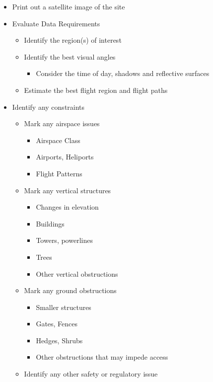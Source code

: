 \documentclass[
]{book}
\providecommand{\tightlist}{%
  \setlength{\itemsep}{0pt}\setlength{\parskip}{0pt}}
\begin{document}
\begin{itemize}
\tightlist
\item
  Print out a satellite image of the site
\item
  Evaluate Data Requirements

  \begin{itemize}
  \tightlist
  \item
    Identify the region(s) of interest
  \item
    Identify the best visual angles

    \begin{itemize}
    \tightlist
    \item
      Consider the time of day, shadows and reflective surfaces
    \end{itemize}
  \item
    Estimate the best flight region and flight paths
  \end{itemize}
\item
  Identify any constraints

  \begin{itemize}
  \tightlist
  \item
    Mark any airspace issues

    \begin{itemize}
    \tightlist
    \item
      Airspace Class
    \item
      Airports, Heliports
    \item
      Flight Patterns
    \end{itemize}
  \item
    Mark any vertical structures

    \begin{itemize}
    \tightlist
    \item
      Changes in elevation
    \item
      Buildings
    \item
      Towers, powerlines
    \item
      Trees
    \item
      Other vertical obstructions
    \end{itemize}
  \item
    Mark any ground obstructions

    \begin{itemize}
    \tightlist
    \item
      Smaller structures
    \item
      Gates, Fences
    \item
      Hedges, Shrubs
    \item
      Other obstructions that may impede access
    \end{itemize}
  \item
    Identify any other safety or regulatory issue


\end{itemize}
\end{itemize}
\end{document}
